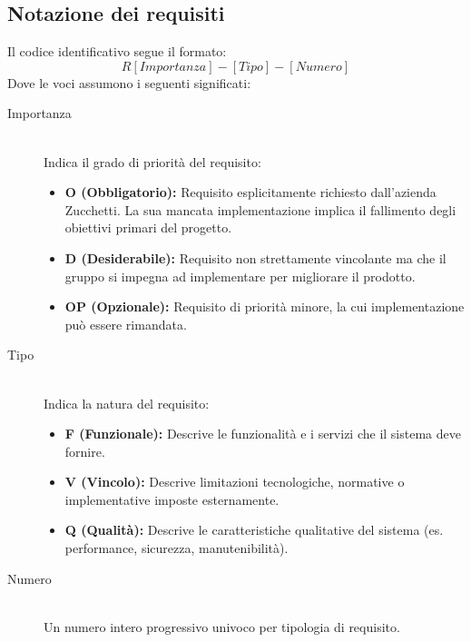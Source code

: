 \documentclass[11pt,a4paper]{article}
\begin{document}
\subsection{Notazione dei requisiti}
Il codice identificativo segue il formato:
\[
R[Importanza]-[Tipo]-[Numero]
\]
Dove le voci assumono i seguenti significati:

\begin{description}
    \item[Importanza] \hfill \\
    Indica il grado di priorità del requisito:
    \begin{itemize}
        \item \textbf{O (Obbligatorio):} Requisito esplicitamente richiesto dall'azienda Zucchetti. La sua mancata implementazione implica il fallimento degli obiettivi primari del progetto.
        \item \textbf{D (Desiderabile):} Requisito non strettamente vincolante ma che il gruppo si impegna ad implementare per migliorare il prodotto.
        \item \textbf{OP (Opzionale):} Requisito di priorità minore, la cui implementazione può essere rimandata.
    \end{itemize}
    
    \item[Tipo] \hfill \\
    Indica la natura del requisito:
    \begin{itemize}
        \item \textbf{F (Funzionale):} Descrive le funzionalità e i servizi che il sistema deve fornire.
        \item \textbf{V (Vincolo):} Descrive limitazioni tecnologiche, normative o implementative imposte esternamente.
        \item \textbf{Q (Qualità):} Descrive le caratteristiche qualitative del sistema (es. performance, sicurezza, manutenibilità).
    \end{itemize}
    
    \item[Numero] \hfill \\
    Un numero intero progressivo univoco per tipologia di requisito.
\end{description}
\end{document}
